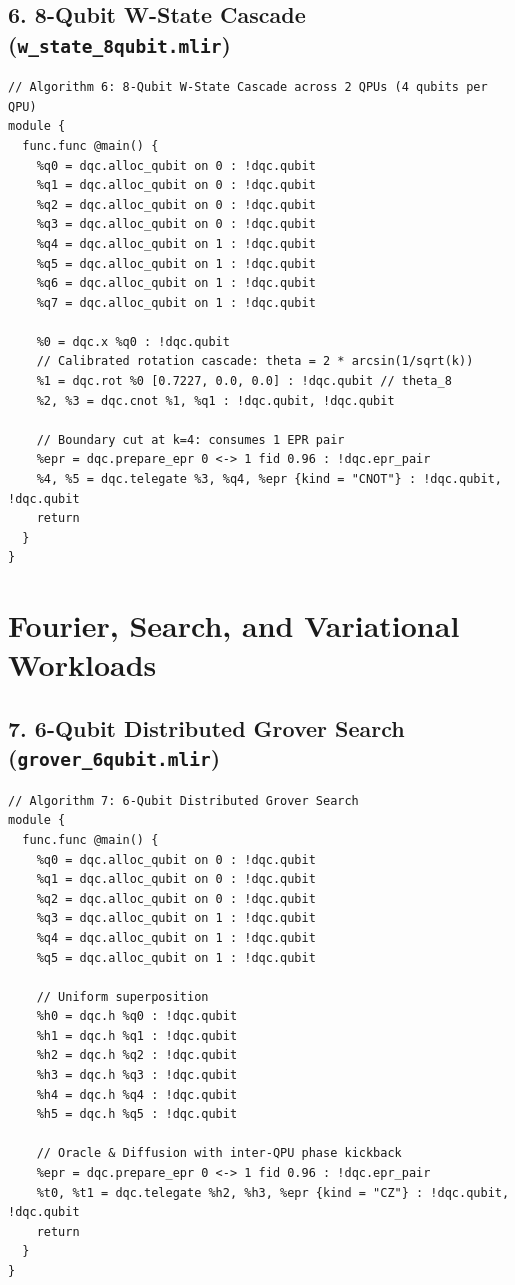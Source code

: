 \subsection{6. 8-Qubit W-State Cascade (\texttt{w\_state\_8qubit.mlir})}
\begin{lstlisting}[language=MLIR, caption={w\_state\_8qubit.mlir}]
// Algorithm 6: 8-Qubit W-State Cascade across 2 QPUs (4 qubits per QPU)
module {
  func.func @main() {
    %q0 = dqc.alloc_qubit on 0 : !dqc.qubit
    %q1 = dqc.alloc_qubit on 0 : !dqc.qubit
    %q2 = dqc.alloc_qubit on 0 : !dqc.qubit
    %q3 = dqc.alloc_qubit on 0 : !dqc.qubit
    %q4 = dqc.alloc_qubit on 1 : !dqc.qubit
    %q5 = dqc.alloc_qubit on 1 : !dqc.qubit
    %q6 = dqc.alloc_qubit on 1 : !dqc.qubit
    %q7 = dqc.alloc_qubit on 1 : !dqc.qubit

    %0 = dqc.x %q0 : !dqc.qubit
    // Calibrated rotation cascade: theta = 2 * arcsin(1/sqrt(k))
    %1 = dqc.rot %0 [0.7227, 0.0, 0.0] : !dqc.qubit // theta_8
    %2, %3 = dqc.cnot %1, %q1 : !dqc.qubit, !dqc.qubit
    
    // Boundary cut at k=4: consumes 1 EPR pair
    %epr = dqc.prepare_epr 0 <-> 1 fid 0.96 : !dqc.epr_pair
    %4, %5 = dqc.telegate %3, %q4, %epr {kind = "CNOT"} : !dqc.qubit, !dqc.qubit
    return
  }
}
\end{lstlisting}

\section{Fourier, Search, and Variational Workloads}

\subsection{7. 6-Qubit Distributed Grover Search (\texttt{grover\_6qubit.mlir})}
\begin{lstlisting}[language=MLIR, caption={grover\_6qubit.mlir}]
// Algorithm 7: 6-Qubit Distributed Grover Search
module {
  func.func @main() {
    %q0 = dqc.alloc_qubit on 0 : !dqc.qubit
    %q1 = dqc.alloc_qubit on 0 : !dqc.qubit
    %q2 = dqc.alloc_qubit on 0 : !dqc.qubit
    %q3 = dqc.alloc_qubit on 1 : !dqc.qubit
    %q4 = dqc.alloc_qubit on 1 : !dqc.qubit
    %q5 = dqc.alloc_qubit on 1 : !dqc.qubit

    // Uniform superposition
    %h0 = dqc.h %q0 : !dqc.qubit
    %h1 = dqc.h %q1 : !dqc.qubit
    %h2 = dqc.h %q2 : !dqc.qubit
    %h3 = dqc.h %q3 : !dqc.qubit
    %h4 = dqc.h %q4 : !dqc.qubit
    %h5 = dqc.h %q5 : !dqc.qubit

    // Oracle & Diffusion with inter-QPU phase kickback
    %epr = dqc.prepare_epr 0 <-> 1 fid 0.96 : !dqc.epr_pair
    %t0, %t1 = dqc.telegate %h2, %h3, %epr {kind = "CZ"} : !dqc.qubit, !dqc.qubit
    return
  }
}
\end{lstlisting}

